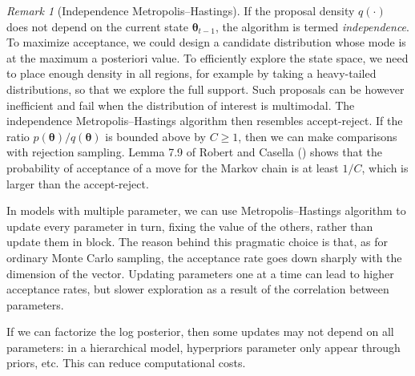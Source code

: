 \documentclass[
  11pt,
  letterpaper,
]{scrbook}
\theoremstyle{definition}
\theoremstyle{plain}
\theoremstyle{plain}
\theoremstyle{definition}
\theoremstyle{definition}
\theoremstyle{remark}
\newtheorem*{remark}{Remark}
\begin{document}
\begin{remark}[Independence Metropolis--Hastings]
If the proposal density \(q(\cdot)\) does not depend on the current
state \(\boldsymbol{\theta}_{t-1}\), the algorithm is termed
\emph{independence}. To maximize acceptance, we could design a candidate
distribution whose mode is at the maximum a posteriori value. To
efficiently explore the state space, we need to place enough density in
all regions, for example by taking a heavy-tailed distributions, so that
we explore the full support. Such proposals can be however inefficient
and fail when the distribution of interest is multimodal. The
independence Metropolis--Hastings algorithm then resembles
accept-reject. If the ratio
\(p(\boldsymbol{\theta})/q(\boldsymbol{\theta})\) is bounded above by
\(C \geq 1\), then we can make comparisons with rejection sampling.
Lemma 7.9 of Robert and Casella
() shows that the probability of
acceptance of a move for the Markov chain is at least \(1/C\), which is
larger than the accept-reject.
\end{remark}

In models with multiple parameter, we can use Metropolis--Hastings
algorithm to update every parameter in turn, fixing the value of the
others, rather than update them in block. The reason behind this
pragmatic choice is that, as for ordinary Monte Carlo sampling, the
acceptance rate goes down sharply with the dimension of the vector.
Updating parameters one at a time can lead to higher acceptance rates,
but slower exploration as a result of the correlation between
parameters.

If we can factorize the log posterior, then some updates may not depend
on all parameters: in a hierarchical model, hyperpriors parameter only
appear through priors, etc. This can reduce computational costs.
\end{document}

